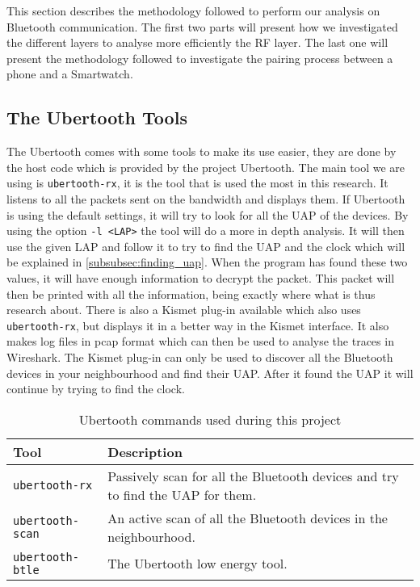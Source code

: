 This section describes the methodology followed to perform our analysis on Bluetooth communication. The first two parts will present how we investigated the different layers to analyse more efficiently the RF layer. The last one will present the methodology followed to investigate the pairing process between a phone and a Smartwatch.


\subsection{The Ubertooth Tools}
\label{subsubsec:ubertooth_tools}
The Ubertooth comes with some tools to make its use easier, they are done by the host code which is provided by the project Ubertooth. 
The main tool we are using is \verb|ubertooth-rx|, it is the tool that is used the most in this research. It listens to all the packets sent on the bandwidth and displays them. If Ubertooth is using the default settings, it will try to look for all the UAP of the devices. By using the option \verb|-l <LAP>| the tool will do a more in depth analysis. It will then use the given LAP and follow it to try to find the UAP and the clock which will be explained in \ref{subsubsec:finding_uap}. When the program has found these two values, it will have enough information to decrypt the packet. This packet will then be printed with all the information, being exactly where what is thus research about. \pend There is also a Kismet plug-in available which also uses \verb|ubertooth-rx|, but displays it in a better way in the Kismet interface. It also makes log files in pcap format which can then be used to analyse the traces in Wireshark. The Kismet plug-in can only be used to discover all the Bluetooth devices in your neighbourhood and find their UAP. After it found the UAP it will continue by trying to find the clock.


\begin{table}[!h]
\begin{tabular}{|l|l|}
\hline
Tool & Description \\
\hline
\verb|ubertooth-rx| & Passively scan for all the Bluetooth devices and try to find the UAP for them. \\
\hline
\verb|ubertooth-scan| & An active scan of all the Bluetooth devices in the neighbourhood.  \\
\hline
\verb|ubertooth-btle| & The Ubertooth low energy tool. \\
\hline
\end{tabular}
\caption{Ubertooth commands used during this project}
\label{tab:ubertooth_tools}
\end{table}
\newpage
